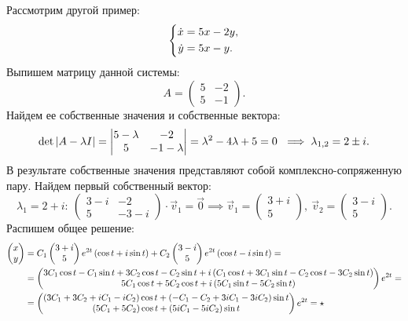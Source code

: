 		Рассмотрим другой пример:
		\[ \left\lbrace \begin{aligned} \dot{x} &= 5x - 2y,\\ \dot{y} &= 5x - y. \end{aligned} \right. \]
		Выпишем матрицу данной системы:
		\[ A = \begin{pmatrix} 5 & -2 \\ 5 & -1 \end{pmatrix}. \]
		Найдем ее собственные значения и собственные вектора:
		\[ \det\left\vert A - \lambda I \right\vert = \begin{vmatrix} 5 - \lambda & -2 \\ 5 & -1 - \lambda \end{vmatrix} = \lambda^2 - 4 \lambda + 5 = 0 ~ \implies \lambda_{1, 2} = 2 \pm i. \]
		В результате собственные значения представляют собой комплексно-сопряженную пару. Найдем первый собственный вектор:
		\[ \lambda_1 = 2 + i: ~ \begin{pmatrix} 3 - i & -2 \\ 5 & -3 - i \end{pmatrix} \cdot \vec{v}_1 = \vec{0} \implies \vec{v}_1 = \begin{pmatrix} 3 + i \\ 5 \end{pmatrix}, ~ \vec{v}_2 = \begin{pmatrix} 3 - i \\ 5 \end{pmatrix}. \]
		Распишем общее решение:
		\[ \begin{split} 
			\begin{pmatrix} x \\ y \end{pmatrix} &= C_1 \begin{pmatrix} 3 + i \\ 5 \end{pmatrix} e^{2t} \left( \cos{t} + i \sin{t} \right) + C_2 \begin{pmatrix} 3 - i \\ 5 \end{pmatrix} e^{2t} \left( \cos{t} - i \sin{t} \right) = \\ 
			&= \begin{pmatrix} 3C_1 \cos{t} - C_1 \sin{t} + 3C_2 \cos{t} - C_2 \sin{t} + i \left( C_1 \cos{t} + 3 C_1 \sin{t} - C_2 \cos{t} - 3C_2 \sin{t}  \right) \\ 5C_1 \cos{t} + 5C_2 \cos{t} + i \left( 5C_1 \sin{t} - 5C_2 \sin{t} \right) \end{pmatrix} e^{2t} = \\
			&= \begin{pmatrix} \left( 3C_1 + 3C_2 + iC_1 - iC_2 \right) \cos{t} + \left( -C_1 - C_2 + 3i C_1 - 3iC_2 \right) \sin{t} \\ \left( 5C_1 + 5C_2 \right) \cos{t} + \left( 5iC_1 - 5iC_2 \right) \sin{t} \end{pmatrix} e^{2t} = \star
		\end{split} \]
